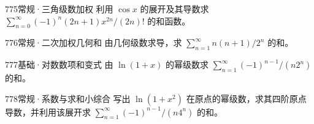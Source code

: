\begin{exercise}{775}{常规·三角级数加权}
利用 $\cos x$ 的展开及其导数求 $\sum_{n=0}^{\infty}(-1)^n(2n+1)x^{2n}/(2n)!$ 的和函数。
\end{exercise}
\begin{exercise}{776}{常规·二次加权几何和}
由几何级数求导，求 $\sum_{n=1}^{\infty}n(n+1)/2^n$ 的和。
\end{exercise}
\begin{exercise}{777}{基础·对数数项和变式}
由 $\ln(1+x)$ 的幂级数求 $\sum_{n=1}^{\infty}(-1)^{n-1}/(n2^n)$ 的和。
\end{exercise}
\begin{exercise}{778}{常规·系数与求和小综合}
写出 $\ln(1+x^2)$ 在原点的幂级数，求其四阶原点导数，并利用该展开求 $\sum_{n=1}^{\infty}(-1)^{n-1}/(n4^n)$ 的和。
\end{exercise}
